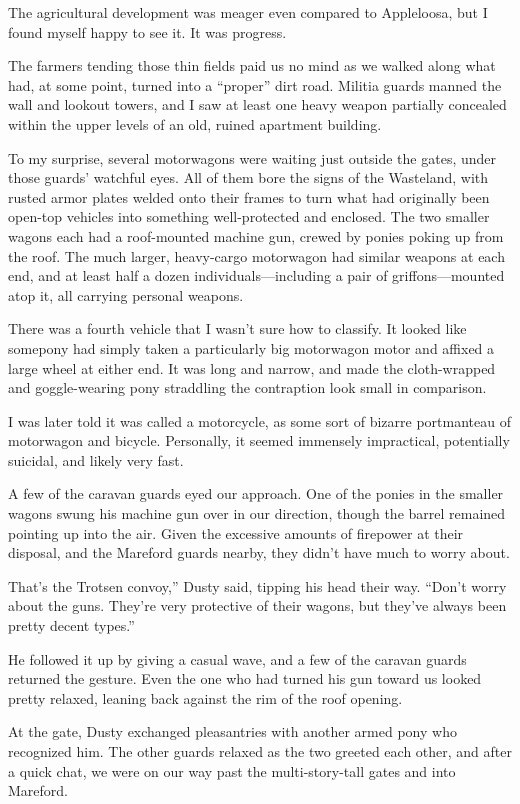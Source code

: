 The agricultural development was meager even compared to Appleloosa, but I found myself happy to see it. It was progress.

The farmers tending those thin fields paid us no mind as we walked along what had, at some point, turned into a “proper” dirt road. Militia guards manned the wall and lookout towers, and I saw at least one heavy weapon partially concealed within the upper levels of an old, ruined apartment building.

To my surprise, several motorwagons were waiting just outside the gates, under those guards’ watchful eyes. All of them bore the signs of the Wasteland, with rusted armor plates welded onto their frames to turn what had originally been open-top vehicles into something well-protected and enclosed. The two smaller wagons each had a roof-mounted machine gun, crewed by ponies poking up from the roof. The much larger, heavy-cargo motorwagon had similar weapons at each end, and at least half a dozen individuals—including a pair of griffons—mounted atop it, all carrying personal weapons.

There was a fourth vehicle that I wasn’t sure how to classify. It looked like somepony had simply taken a particularly big motorwagon motor and affixed a large wheel at either end. It was long and narrow, and made the cloth-wrapped and goggle-wearing pony straddling the contraption look small in comparison.

I was later told it was called a motorcycle, as some sort of bizarre portmanteau of motorwagon and bicycle. Personally, it seemed immensely impractical, potentially suicidal, and likely very fast.

A few of the caravan guards eyed our approach. One of the ponies in the smaller wagons swung his machine gun over in our direction, though the barrel remained pointing up into the air. Given the excessive amounts of firepower at their disposal, and the Mareford guards nearby, they didn’t have much to worry about.

\leavevmode{}That’s the Trotsen convoy,” Dusty said, tipping his head their way. “Don’t worry about the guns. They’re very protective of their wagons, but they’ve always been pretty decent types.”

He followed it up by giving a casual wave, and a few of the caravan guards returned the gesture. Even the one who had turned his gun toward us looked pretty relaxed, leaning back against the rim of the roof opening.

At the gate, Dusty exchanged pleasantries with another armed pony who recognized him. The other guards relaxed as the two greeted each other, and after a quick chat, we were on our way past the multi-story-tall gates and into Mareford.


